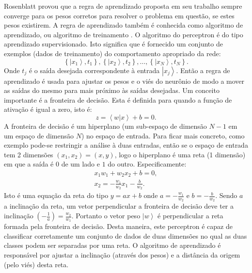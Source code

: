 Rosenblatt provou que a regra de aprendizado proposta em seu trabalho sempre converge para os pesos corretos para resolver o problema em questão, se estes pesos existirem. A regra de aprendizado também é conhecida como algoritmo de aprendizado, ou algoritmo de treinamento \cite{NND}. O algoritmo do perceptron é do tipo  aprendizado supervisionado. Isto significa que é fornecido um conjunto de exemplos (dados de treinamento) do comportamento apropriado da rede:
\begin{equation}\left\{ \left|x_{1}\right\rangle ,t_{1}\right\} ,\left\{ \left|x_{2}\right\rangle ,t_{2}\right\} ,\dots,\left\{ \left|x_{N}\right\rangle ,t_{N}\right\} . \end{equation}
Onde $t_j$ é o saída desejada correspondente à entrada $\left|x_{j}\right\rangle $. Então a regra de aprendizado é usada para ajustar os pesos e o viés do neurônio de modo  a mover as saídas do mesmo para mais próximo às saídas desejadas. Um conceito importante é a fronteira de decisão. Esta é definida para quando a função de ativação é igual a zero, isto é:
\begin{equation}z=\left\langle w|x\right\rangle +b=0.\end{equation}A fronteira de decisão é um hiperplano (um sub-espaço de dimensão $N-1$ em um espaço de dimensão $N$) no espaço de entrada. Para ficar mais concreto, como exemplo pode-se restringir a análise à duas entradas, então se o espaço de entrada tem 2 dimensões $\left(x_{1},x_{2}\right)=\left(x,y\right)$, logo o hiperplano é uma reta (1 dimensão)  em que a saída é $0$ de um lado e $1$ do outro. Especificamente:
\begin{equation}
\begin{split}
x_{1}w_{1}+w_{2}x_{2}+b=0, \\
x_{2}=-\frac{w_{1}}{w_{2}}x_{1}-\frac{b}{w_{2}}.
 \end{split}
\end{equation}
 Isto é uma equação da reta do tipo $y=ax+b$ onde $a=-\frac{w_{1}}{w_{2}}$ e $b=-\frac{b}{w_{2}}$. Sendo $a$  a inclinação da reta, um vetor perpendicular a fronteira de decisão deve ter a inclinação $\left(-\frac{1}{a}\right)=\frac{w_{2}}{w_{1}}$. Portanto o vetor peso $\left|w\right\rangle $ é perpendicular a reta formada pela fronteira de decisão.  Desta maneira, este perceptron é capaz de classificar corretamente um conjunto de dados de duas dimensões no qual as duas classes podem ser separadas por uma reta. O algoritmo de aprendizado é responsável por ajustar a inclinação (através dos pesos) e a distância da origem (pelo viés) desta reta.

